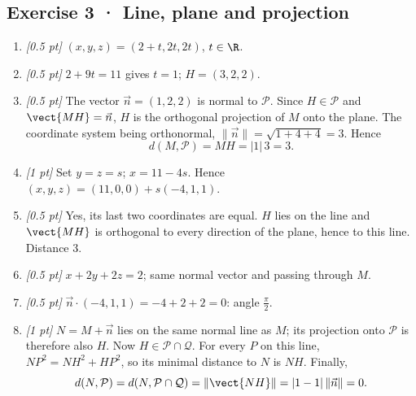 \subsection*{Exercise 3 · Line, plane and projection}\begin{enumerate}

\item \textit{[0.5 pt]} $(x,y,z)=(2+t,2t,2t)$, $t\in\R$.

\item \textit{[0.5 pt]} $2+9t=11$ gives $t=1$; $H=(3,2,2)$.

\item \textit{[0.5 pt]} The vector $\vec n=(1,2,2)$ is normal to $\mathcal P$. Since $H\in\mathcal P$ and $\vect{MH}=\vec n$, $H$ is the orthogonal projection of $M$ onto the plane. The coordinate system being orthonormal, $\|\vec n\|=\sqrt{1+4+4}=3$. Hence
\[d(M,\mathcal P)=MH=|1|\,3=3.\]

\item \textit{[1 pt]} Set $y=z=s$; $x=11-4s$. Hence $(x,y,z)=(11,0,0)+s(-4,1,1)$.

\item \textit{[0.5 pt]} Yes, its last two coordinates are equal. $H$ lies on the line and $\vect{MH}$ is orthogonal to every direction of the plane, hence to this line. Distance $3$.

\item \textit{[0.5 pt]} $x+2y+2z=2$; same normal vector and passing through $M$.

\item \textit{[0.5 pt]} $\vec n\cdot(-4,1,1)=-4+2+2=0$: angle $\frac{\pi}{2}$.

\item \textit{[1 pt]} $N=M+\vec n$ lies on the same normal line as $M$; its projection onto $\mathcal P$ is therefore also $H$. Now $H\in\mathcal P\cap\mathcal Q$. For every $P$ on this line, $NP^2=NH^2+HP^2$, so its minimal distance to $N$ is $NH$. Finally,
\[d(N,\mathcal P)=d(N,\mathcal P\cap\mathcal Q)=\|\vect{NH}\|=|1-1|\,\|\vec n\|=0.\]

\end{enumerate}

